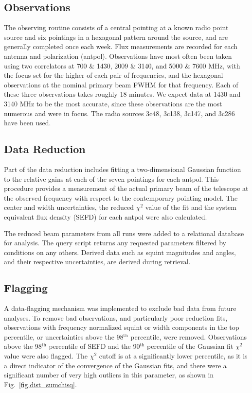 \documentclass[preprint]{aastex}
\begin{document}
\subsection{Observations}\label{ss.observations}
The  observing routine consists of a central pointing at a known
radio point source and six pointings in a hexagonal pattern around the
source, and are generally completed once each week.  Flux measurements
are recorded for each antenna and polarization (antpol). Observations
have most often been taken using two correlators at 700 \& 1430, 2009
\& 3140, and 5000 \& 7600 MHz, with the focus set for the higher of
each pair of frequencies, and the hexagonal observations at the
nominal primary beam FWHM for that frequency.  Each of these three
observations takes roughly 18 minutes. We expect data at 1430 and 3140
MHz to be the most accurate, since these observations are the most
numerous and were in focus. The radio sources 3c48, 3c138, 3c147, and
3c286 have been used.

\subsection{Data Reduction}\label{ss.reduction}
Part of the data reduction includes fitting a two-dimensional Gaussian
function to the relative gains at each of the seven pointings for each
antpol.  This procedure provides a measurement of the actual primary
beam of the telescope at the observed frequency with respect to the
contemporary pointing model.  The center and width uncertainties, the
reduced $\chi^2$ value of the fit and the system equivalent flux
density (SEFD) for each antpol were also calculated.

The reduced beam parameters from all runs were added to a relational
database for analysis.  The query script returns any requested
parameters filtered by conditions on any others.  Derived data such as
squint magnitudes and angles, and their respective uncertainties, are
derived during retrieval.

\subsection{Flagging}\label{ss.flagging}
A data-flagging mechanism was implemented to exclude bad data from
future analyses.  To remove bad observations, and particularly poor
reduction fits, observations with frequency normalized squint or width
components in the top percentile, or uncertainties above the
98$^\textrm{th}$ percentile, were removed.  Observations above the
98$^\textrm{th}$ percentile of SEFD and the 90$^\textrm{th}$
percentile of the Gaussian fit $\chi^2$ value were also flagged.  The
$\chi^2$ cutoff is at a significantly lower percentile, as it is a
direct indicator of the convergence of the Gaussian fits, and there
were a significant number of very high outliers in this parameter, as
shown in Fig.~\ref{fig.dist_sumchisq}.
\end{document}

